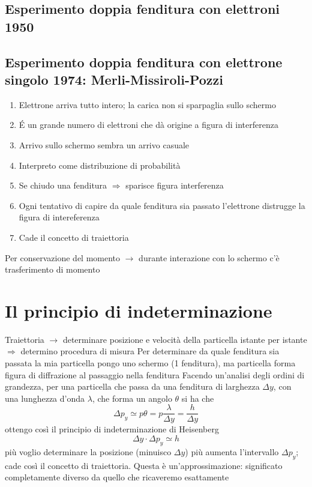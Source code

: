 \documentclass[a4paper,11pt]{report}
\theoremstyle{remark}
\theoremstyle{definition}
\begin{document}
\section*{Esperimento doppia fenditura con elettroni 1950}
\section*{Esperimento doppia fenditura con elettrone singolo 1974: Merli-Missiroli-Pozzi}
\begin{enumerate}
    \item Elettrone arriva tutto intero; la carica non si sparpaglia sullo schermo
    \item \'E un grande numero di elettroni che dà origine a figura di interferenza
    \item Arrivo sullo schermo sembra un arrivo casuale
    \item Interpreto come distribuzione di probabilità
    \item Se chiudo una fenditura $\Rightarrow$ sparisce figura interferenza
    \item Ogni tentativo di capire da quale fenditura sia passato l'elettrone distrugge la figura di intereferenza
    \item Cade il concetto di traiettoria 
\end{enumerate}
Per conservazione del momento $\rightarrow$ durante interazione con lo schermo c'è trasferimento di momento

\chapter{Il principio di indeterminazione}
Traiettoria $\rightarrow$ determinare posizione e velocità della particella istante per istante $\Rightarrow$ determino procedura di misura \newline
Per determinare da quale fenditura sia passata la mia particella pongo uno schermo (1 fenditura), ma particella forma figura di diffrazione al passaggio nella fenditura \newline
Facendo un'analisi degli ordini di grandezza, per una particella che passa da una fenditura di larghezza $\Delta y$, con una lunghezza d'onda $\lambda$, che forma un angolo $\theta$ si ha che
\begin{equation*}
    \Delta p_y \simeq p\theta = p \frac{\lambda}{\Delta y} = \frac{h}{\Delta y}
\end{equation*}
ottengo così il principio di indeterminazione di Heisenberg
\begin{equation}
    \Delta y \cdot \Delta p_y \simeq h
\end{equation}
più voglio determinare la posizione (minuisco $\Delta y$) più aumenta l'intervallo $\Delta p_y$; cade così il concetto di traiettoria. \newline
Questa è un'approssimazione: significato completamente diverso da quello che ricaveremo esattamente \newline
\end{document}
